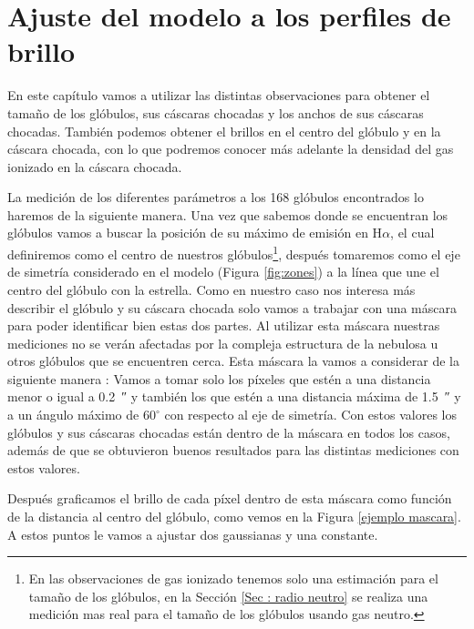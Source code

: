 \documentclass{book}
\begin{document}
\chapter{Ajuste del modelo a los perfiles de brillo}\label{Chapter : Ajuste}

En este capítulo vamos a utilizar las distintas observaciones para obtener el tamaño de los glóbulos, sus cáscaras chocadas y los anchos de sus cáscaras chocadas. También podemos obtener el brillos en el centro del glóbulo y en la cáscara chocada, con lo que podremos conocer más adelante la densidad del gas ionizado en la cáscara chocada.

La medición de los diferentes parámetros a los 168 glóbulos encontrados lo haremos de la siguiente manera. Una vez que sabemos donde se encuentran los glóbulos vamos a buscar la posición de su máximo de emisión en H$\alpha$, el cual definiremos como el centro de nuestros glóbulos\footnote{En las observaciones de gas ionizado tenemos solo una estimación para el tamaño de los glóbulos, en la Sección \ref{Sec : radio neutro} se realiza una medición mas real para el tamaño de los glóbulos usando gas neutro.}, después tomaremos como el eje de simetría considerado en el modelo (Figura \ref{fig:zones}) a la línea que une el centro del glóbulo con la estrella. Como en nuestro caso nos interesa más describir el glóbulo y su cáscara chocada solo vamos a trabajar con una máscara para poder identificar bien estas dos partes. Al utilizar esta máscara nuestras mediciones no se verán afectadas por la compleja estructura de la nebulosa u otros glóbulos que se encuentren cerca. Esta máscara la vamos a considerar de la siguiente manera : Vamos a tomar solo los píxeles que estén a una distancia menor o igual a \SI{0.2}{\arcsecond} y también los que estén a una distancia máxima de \SI{1.5}{\arcsecond} y a un ángulo máximo de $60^\circ$ con respecto al eje de simetría. Con estos valores los glóbulos y sus cáscaras chocadas están dentro de la máscara en todos los casos, además de que se obtuvieron buenos resultados para las distintas mediciones con estos valores.

Después graficamos el brillo de cada píxel dentro de esta máscara como función de la distancia al centro del glóbulo, como vemos en la Figura \ref{ejemplo mascara}. A estos puntos le vamos a ajustar dos gaussianas y una constante.
\end{document}
